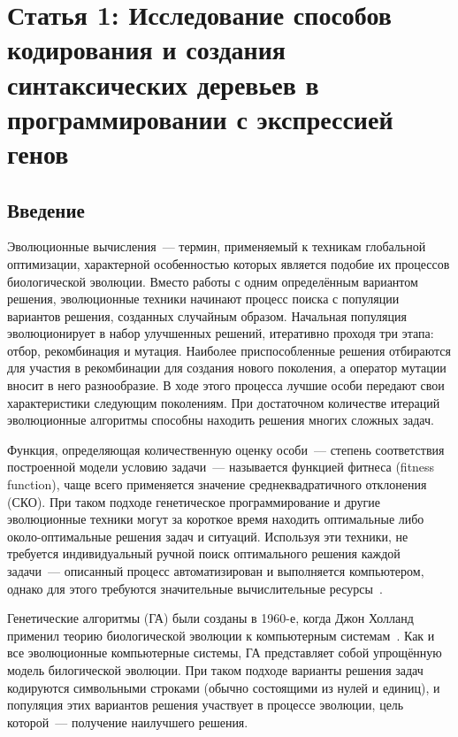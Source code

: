 \section{Статья 1: Исследование способов кодирования и создания синтаксических деревьев в программировании с экспрессией генов}

\subsection{Введение}

Эволюционные вычисления~--- термин, применяемый к техникам глобальной оптимизации, характерной особенностью которых является подобие их процессов биологической эволюции. Вместо работы с одним определённым вариантом решения, эволюционные техники начинают процесс поиска с популяции вариантов решения, созданных случайным образом. Начальная популяция эволюционирует в набор улучшенных решений, итеративно проходя три этапа: отбор, рекомбинация и мутация. Наиболее приспособленные решения отбираются для участия в рекомбинации для создания нового поколения, а оператор мутации вносит в него разнообразие. В ходе этого процесса лучшие особи передают свои характеристики следующим поколениям. При достаточном количестве итераций эволюционные алгоритмы способны находить решения многих сложных задач.

Функция, определяющая количественную оценку особи~--- степень соответствия построенной модели условию задачи~--- называется функцией фитнеса (fitness function), чаще всего применяется значение среднеквадратичного отклонения (СКО). При таком подходе генетическое программирование и другие эволюционные техники могут за короткое время находить оптимальные либо около-оптимальные решения задач и ситуаций. Используя эти техники, не требуется индивидуальный ручной поиск оптимального решения каждой задачи~--- описанный процесс автоматизирован и выполняется компьютером, однако для этого требуются значительные вычислительные ресурсы~\cite{Nunez:2006:msoec}.

Генетические алгоритмы (ГА) были созданы в 1960-е, когда Джон Холланд применил теорию биологической эволюции к компьютерным системам~\cite{Holland:1975}. Как и все эволюционные компьютерные системы, ГА представляет собой упрощённую модель билогической эволюции. При таком подходе варианты решения задач кодируются символьными строками (обычно состоящими из нулей и единиц), и популяция этих вариантов решения участвует в процессе эволюции, цель которой~--- получение наилучшего решения.

